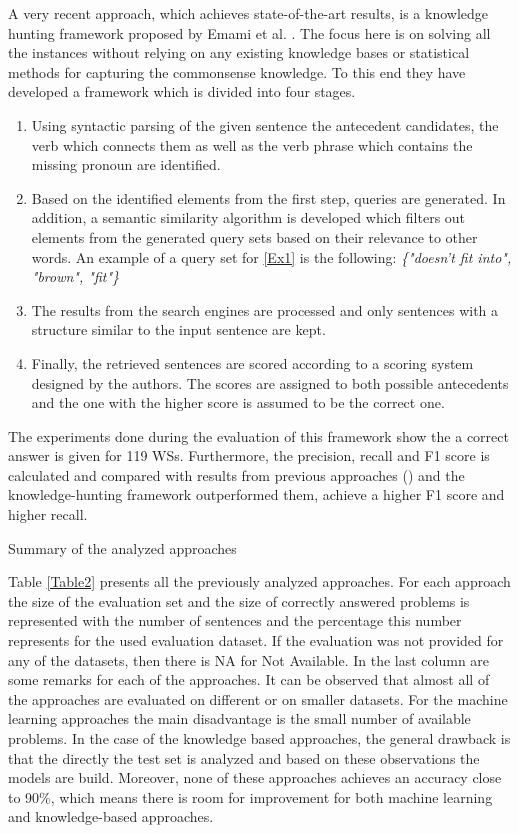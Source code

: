   
A very recent approach, which achieves state-of-the-art results, is a knowledge hunting framework proposed by Emami et al. \cite{DBLP:conf/emnlp/EmamiCTSC18}. The focus here is on solving all the instances without relying on any existing knowledge bases or statistical methods for capturing the commonsense knowledge. To this end they have developed a framework which is divided into four stages.
\begin{enumerate}
	\item Using syntactic parsing of the given sentence the antecedent candidates, the verb which connects them as well as the verb phrase which contains the missing pronoun are identified.
	\item Based on the identified elements from the first step, queries are generated. In addition, a semantic similarity algorithm is developed which filters out elements from the generated query sets based on their relevance to other words.
	An example of a query set for \ref{Ex1} is the following: \textit{\{"doesn't fit into", "brown", "fit"\}}
	\item The results from the search engines are processed and only sentences with a structure similar to the input sentence are kept.
	\item Finally, the retrieved sentences are scored according to a scoring system designed by the authors. The scores are assigned to both possible antecedents and the one with the higher score is assumed to be the correct one.
\end{enumerate}

 The experiments done during the evaluation of this framework show the a correct answer is given for 119 WSs. Furthermore, the precision, recall and F1 score is calculated and compared with results from previous approaches (\cite{DBLP:conf/aaai/SharmaB16, DBLP:conf/aaaiss/LiuJLZWH17}) and the knowledge-hunting framework outperformed them, achieve a higher F1 score and higher recall. \\

\begin{table}[h!]
	\centering
	
	\caption{{\label{Table2}}Summary of the analyzed approaches}
\end{table}

Table \ref{Table2} presents all the previously analyzed approaches. For each approach the size of the evaluation set and the size of correctly answered problems is represented with the number of sentences and the percentage this number represents for the used evaluation dataset. If the evaluation was not provided for any of the datasets, then there is NA for Not Available. In the last column are some remarks for each of the approaches. 
It can be observed that almost all of the approaches are evaluated on different or on smaller datasets. 
For the machine learning approaches the main disadvantage is the small number of available problems. 
In the case of the knowledge based approaches, the general drawback is that the directly the test set is analyzed and based on these observations the models are build. 
Moreover, none of these approaches achieves an accuracy close to 90\%, which means there is room for improvement for both machine learning and knowledge-based approaches. 
